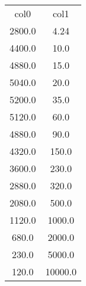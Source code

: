 \begin{table}
\begin{tabular}{cc}
col0 & col1 \\
2800.0 & 4.24 \\
4400.0 & 10.0 \\
4880.0 & 15.0 \\
5040.0 & 20.0 \\
5200.0 & 35.0 \\
5120.0 & 60.0 \\
4880.0 & 90.0 \\
4320.0 & 150.0 \\
3600.0 & 230.0 \\
2880.0 & 320.0 \\
2080.0 & 500.0 \\
1120.0 & 1000.0 \\
680.0 & 2000.0 \\
230.0 & 5000.0 \\
120.0 & 10000.0 \\
\end{tabular}
\end{table}
